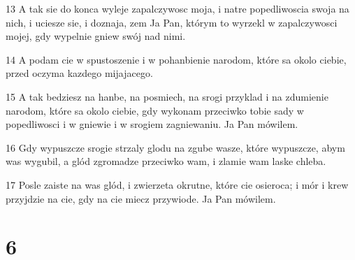 \par 13 A tak sie do konca wyleje zapalczywosc moja, i natre popedliwoscia swoja na nich, i uciesze sie, i doznaja, zem Ja Pan, którym to wyrzekl w zapalczywosci mojej, gdy wypelnie gniew swój nad nimi.
\par 14 A podam cie w spustoszenie i w pohanbienie narodom, które sa okolo ciebie, przed oczyma kazdego mijajacego.
\par 15 A tak bedziesz na hanbe, na posmiech, na srogi przyklad i na zdumienie narodom, które sa okolo ciebie, gdy wykonam przeciwko tobie sady w popedliwosci i w gniewie i w srogiem zagniewaniu. Ja Pan mówilem.
\par 16 Gdy wypuszcze srogie strzaly glodu na zgube wasze, które wypuszcze, abym was wygubil, a glód zgromadze przeciwko wam, i zlamie wam laske chleba.
\par 17 Posle zaiste na was glód, i zwierzeta okrutne, które cie osieroca; i mór i krew przyjdzie na cie, gdy na cie miecz przywiode. Ja Pan mówilem.

\chapter{6}

